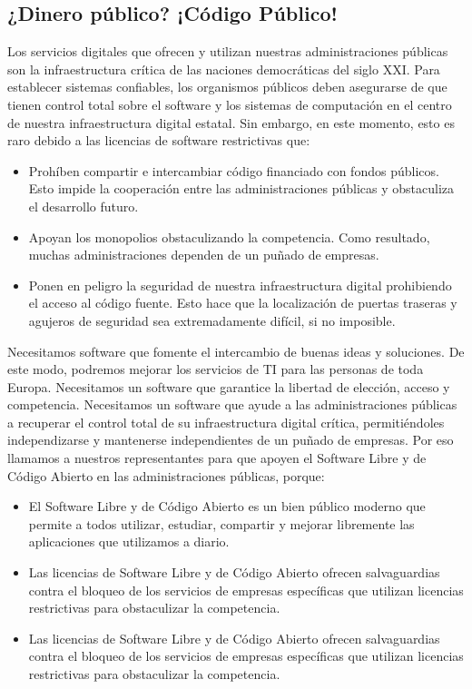 \documentclass[10pt,foldmark,tumble]{leaflet}
\begin{document}
  \subsection{ ¿Dinero público? ¡Código Público!}
\vspace{.5em}

    Los servicios digitales que ofrecen y utilizan nuestras administraciones públicas son la infraestructura crítica de las naciones democráticas del siglo XXI. Para establecer sistemas confiables, los organismos públicos deben asegurarse de que tienen control total sobre el software y los sistemas de computación en el centro de nuestra infraestructura digital estatal. Sin embargo, en este momento, esto es raro debido a las licencias de software restrictivas que:

\begin{itemize}
    \item Prohíben compartir e intercambiar código financiado con fondos públicos. Esto impide la cooperación entre las administraciones públicas y obstaculiza el desarrollo futuro.
    \item Apoyan los monopolios obstaculizando la competencia. Como resultado, muchas administraciones dependen de un puñado de empresas.
    \item Ponen en peligro la seguridad de nuestra infraestructura digital prohibiendo el acceso al código fuente. Esto hace que la localización de puertas traseras y agujeros de seguridad sea extremadamente difícil, si no imposible.
\end{itemize}

    Necesitamos software que fomente el intercambio de buenas ideas y soluciones. De este modo, podremos mejorar los servicios de TI para las personas de toda Europa. Necesitamos un software que garantice la libertad de elección, acceso y competencia. Necesitamos un software que ayude a las administraciones públicas a recuperar el control total de su infraestructura digital crítica, permitiéndoles independizarse y mantenerse independientes de un puñado de empresas. Por eso llamamos a nuestros representantes para que apoyen el Software Libre y de Código Abierto en las administraciones públicas, porque:

\begin{itemize}
    \item El Software Libre y de Código Abierto es un bien público moderno que permite a todos utilizar, estudiar, compartir y mejorar libremente las aplicaciones que utilizamos a diario.
    \item Las licencias de Software Libre y de Código Abierto ofrecen salvaguardias contra el bloqueo de los servicios de empresas específicas que utilizan licencias restrictivas para obstaculizar la competencia.
    \item Las licencias de Software Libre y de Código Abierto ofrecen salvaguardias contra el bloqueo de los servicios de empresas específicas que utilizan licencias restrictivas para obstaculizar la competencia.
\end{itemize}
\end{document}
